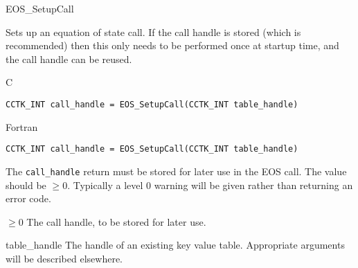 \begin{FunctionDescription}{EOS\_SetupCall}
  \label{Whisky_Dev_EOSBase_General_EOS_SetupCall}

  Sets up an equation of state call. If the call handle is stored
  (which is recommended) then this only needs to be performed once at
  startup time, and the call handle can be reused.

  \begin{SynopsisSection}
    \begin{Synopsis}{C}
\begin{verbatim}
CCTK_INT call_handle = EOS_SetupCall(CCTK_INT table_handle)
\end{verbatim}
    \end{Synopsis}
    \begin{Synopsis}{Fortran}
\begin{verbatim}
CCTK_INT call_handle = EOS_SetupCall(CCTK_INT table_handle)
\end{verbatim}
    \end{Synopsis}
  \end{SynopsisSection}

  \begin{ResultSection}
    \begin{ResultNote}
      The {\tt call\_handle} return must be stored for later use in
      the EOS call. The value should be $\geq 0$. Typically a level
      0 warning will be given rather than returning an error code.
    \end{ResultNote}
    \begin{Result}{$\geq 0$}
      The call handle, to be stored for later use.
    \end{Result}
  \end{ResultSection}
  
  \begin{ParameterSection}
    \begin{Parameter}{table\_handle}
      The handle of an existing key value table. Appropriate
      arguments will be described elsewhere.
    \end{Parameter}
  \end{ParameterSection}
  

\end{FunctionDescription}
